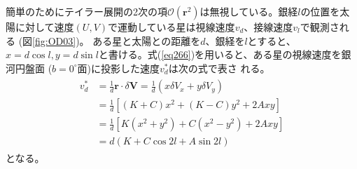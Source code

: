 簡単のためにテイラー展開の2次の項$\mathcal{O}(\pmb{r}^2)$は無視している。銀経$l$の位置を太陽に対して速度$(U,V)$で運動している星は視線速度$v_d$、接線速度$v_l$で観測される (図\ref{fig:OD03})。
ある星と太陽との距離を$d$、銀経を$l$とすると、$x = d\cos l,y = d \sin l$と書ける。式(\ref{eq266})を用いると、ある星の視線速度を銀河円盤面 ($b=0^{\circ}$面)に投影した速度$v^*_d$は次の式で表さ
れる。
\begin{align}
\begin{aligned}
	v^*_d &= \frac{1}{d} \pmb{r} \cdot \delta\pmb{V}
	= \frac{1}{d}(x\delta V_x + y\delta V_y) \\
	&= \frac{1}{d} [(K+C)x^2 + (K-C)y^2 + 2Axy] \\
	&= \frac{1}{d} [K(x^2 + y^2) + C(x^2 - y^2) + 2Axy] \\
	&= d(K + C\cos2l + A\sin2l)
\end{aligned} \label{vd}
\end{align}
となる。

